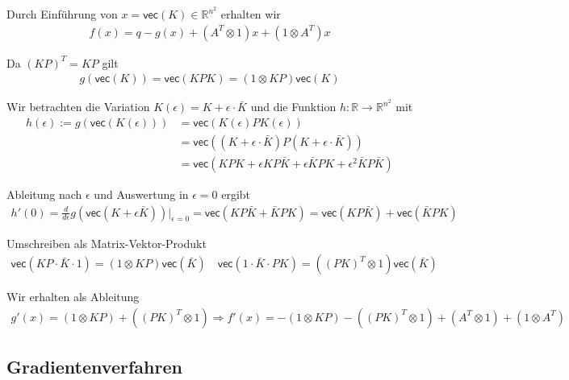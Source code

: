 \documentclass[a4paper, 12pt]{scrartcl}
\begin{document}
Durch Einführung von $x = \textsf{vec}(K) \in \mathbb{R}^{n^2}$ erhalten wir 
%
\begin{align*}
    f(x) = q - g(x)+ (A^T \otimes 1)x + (1 \otimes A^T)x
\end{align*}

Da $(KP)^T = KP$ gilt 
% 
\begin{align*}
    g(\textsf{vec}(K)) = \textsf{vec}(KPK) = (1 \otimes KP) \textsf{vec}(K) 
\end{align*}



Wir betrachten die Variation $K(\epsilon) = K + \epsilon \cdot \bar{K}$ und die Funktion $h:\mathbb{R} \to \mathbb{R}^{n^2}$ mit
%
\begin{align*}
    h(\epsilon) 
    := g(\textsf{vec}(K(\epsilon))) 
    &= \textsf{vec}(K(\epsilon) P K(\epsilon)) \\
    &= \textsf{vec}((K + \epsilon \cdot \bar{K}) P (K + \epsilon \cdot \bar{K})) \\
    &= \textsf{vec}(KPK + \epsilon KP \bar{K} + \epsilon \bar{K} PK + \epsilon^2 \bar{K} P \bar{K})
\end{align*}

Ableitung nach $\epsilon$ und Auswertung in $\epsilon = 0$ ergibt
%
\begin{align*}
    h'(0) 
    = \frac{d}{d\epsilon} g(\textsf{vec}(K + \epsilon \bar{K})) \bigg|_{\epsilon = 0} 
    = \textsf{vec}(KP\bar{K} + \bar{K}PK)
    = \textsf{vec}(KP\bar{K}) + \textsf{vec}(\bar{K}PK)
\end{align*}

Umschreiben als Matrix-Vektor-Produkt
%
\begin{align*}
    \textsf{vec}(KP \cdot \bar{K} \cdot 1) = (1 \otimes KP) \textsf{vec}(\bar{K}) \quad \textsf{vec}(1 \cdot \bar{K} \cdot PK) = ((PK)^T \otimes 1) \textsf{vec}(\bar{K})
\end{align*}

Wir erhalten als Ableitung 
%
\begin{align*}
    g'(x) = (1 \otimes KP) + ((PK)^T \otimes 1) \Rightarrow f'(x) = - (1 \otimes KP) - ((PK)^T \otimes 1) + (A^T \otimes 1) + (1 \otimes A^T)
\end{align*}

\newpage


\subsection{Gradientenverfahren} 
\end{document}
